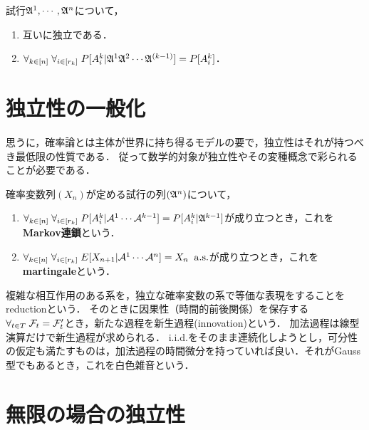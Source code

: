 \documentclass[uplatex,dvipdfmx]{jsreport}
\begin{document}
\begin{lemma}[独立性の条件付き期待値による特徴付け]
    試行$\mathfrak{A}^1,\cdots,\mathfrak{A}^n$について，
    \begin{enumerate}
        \item 互いに独立である．
        \item $\forall_{k\in[n]}\;\forall_{i\in[r_k]}\;P[A_i^k|\mathfrak{A}^1\mathfrak{A}^2\cdots\mathfrak{A}^{(k-1)}]=P[A_i^k]$．
    \end{enumerate}
\end{lemma}

\section{独立性の一般化}

\begin{tcolorbox}[colframe=ForestGreen, colback=ForestGreen!10!white,breakable,colbacktitle=ForestGreen!40!white,coltitle=black,fonttitle=\bfseries\sffamily,
title=]
    思うに，確率論とは主体が世界に持ち得るモデルの要で，独立性はそれが持つべき最低限の性質である．
    従って数学的対象が独立性やその変種概念で彩られることが必要である．
\end{tcolorbox}

\begin{definition}
    確率変数列$(X_n)$が定める試行の列$(\mathfrak{A}^n)$について，
    \begin{enumerate}
        \item $\forall_{k\in[n]}\;\forall_{i\in[r_k]}\;P[A_i^k|\mathcal{A}^1\cdots\mathcal{A}^{k-1}]=P[A^k_i|\mathfrak{A}^{k-1}]$が成り立つとき，これを\textbf{Markov連鎖}という．
        \item $\forall_{k\in[n]}\;\forall_{i\in[r_k]}\;E[X_{n+1}|\mathcal{A}^1\cdots\mathcal{A}^n]=X_n\;\;\mathrm{a.s.}$が成り立つとき，これを\textbf{martingale}という．
    \end{enumerate}
\end{definition}

\begin{remark}[確率解析の精神]
    複雑な相互作用のある系を，独立な確率変数の系で等価な表現をすることを
    reductionという．
    そのときに因果性（時間的前後関係）を保存する$\forall_{t\in T}\;\mathcal{F}_t=\mathcal{F}'_t$とき，新たな過程を新生過程(innovation)という．
    加法過程は線型演算だけで新生過程が求められる．
    i.i.d.をそのまま連続化しようとし，可分性の仮定も満たすものは，加法過程の時間微分を持っていれば良い．それがGauss型でもあるとき，これを白色雑音という．
\end{remark}


\section{無限の場合の独立性}
\end{document}
